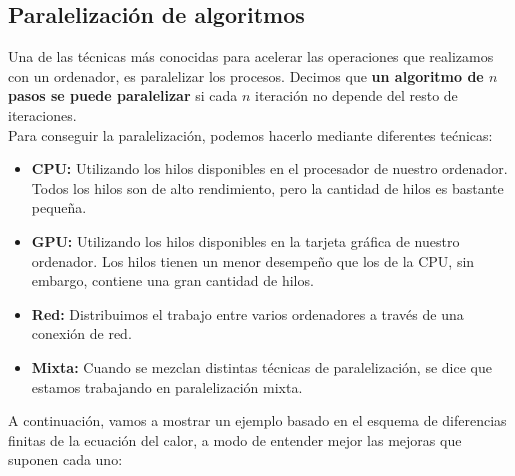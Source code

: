 \subsection{Paralelización de algoritmos}
Una de las técnicas más conocidas para acelerar las operaciones que realizamos con un ordenador, es paralelizar los procesos.  Decimos que \textbf{un algoritmo de $n$ pasos se puede paralelizar} si cada $n$ iteración no depende del resto de iteraciones. \\
Para conseguir la paralelización, podemos hacerlo mediante diferentes tećnicas:

\begin{itemize}
\item \textbf{CPU:} Utilizando los hilos disponibles en el procesador de nuestro ordenador. Todos los hilos son de alto rendimiento, pero la cantidad de hilos es bastante pequeña.

\item \textbf{GPU:} Utilizando los hilos disponibles en la tarjeta gráfica de nuestro\\ ordenador. Los hilos tienen un menor desempeño que los de la CPU, sin embargo, contiene una gran cantidad de hilos.
  
\item \textbf{Red:} Distribuimos el trabajo entre varios ordenadores a través de una conexión de red.
  
\item \textbf{Mixta: } Cuando se mezclan distintas técnicas de paralelización, se dice que estamos trabajando en paralelización mixta.
\end{itemize}

A continuación, vamos a mostrar un ejemplo basado en el esquema de diferencias finitas de la ecuación del calor, a modo de entender mejor las mejoras que suponen cada uno:

